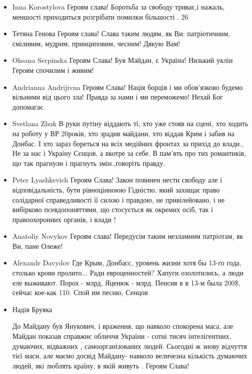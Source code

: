 \begin{itemize}
\item Inna Korostylova
Героям слава!
Боротьба за свободу триває,і нажаль, меншості приходиться розгрібати помилки більшості .
26


\item Тетяна Генова
Героям слава! Слава таким людям, як Ви: патріотичним, сміливим, мудрим, принциповим, чесним! Дякую Вам!

\item Oksana Serpinska
Героям Слава! Був Майдан, є Україна! Низький уклін Героям спочилим і живим!

\item Andrianna Andrijivna
Героям Слава! Нація борців і ми обов'язково будемо вільними від цього зла! Правда за нами і ми переможемо! Нехай Бог допомагає.

\item Svetlana Zhuk
В руки путіну віддають ті, хто уже стояв на сцені, хто ходить на роботу у ВР
20років, хто зрадив майдани, хто віддав Крим і забив на Донбас. І хто зараз
бореться на всіх медійних фронтах за прихід до влади., Не за нас і Україну
Сєнцов, а вкотре за себе.  В пам'ять про тих романтиків, що так прагнули і
прагнуть змін.,говоріть правду.

\item Peter Lyashkevich
Героям Слава!
Закон повинен нести свободу але і відповідальність, бути рівноцінноюю Гідністю, який захищає право солідарної справедливості її силою і правдою, не привілейовано, і не вибірково
псевдопоняттями, що стосується як окремих осіб, так і правоохоронних органів, і влади !

\item Anatoliy Novykov
Героям слава! Передусім таким незламним патріотам, як Ви, пане Олеже!

\item Alexandr Davydov
Где Крым, Донбасс, уровень жизни хотя бы 13-го года, столько крови пролито...
Ради евроценностей? Хапуги озолотились, а люди еле выживают. Порох - млрд,
Яценюк - млрд. Пенсия в в 13-м была 200\$, сейчас кое-как 110. Спой им песню,
Сенцов

\item Надія Бруяка

До Майдану був Янукович, і враження, що навколо спокорена маса, але Майдан
показав справжнє обличчя України - сотні тисяч інтелігентних, думаючих,
відважних , самоорганізованих людей. Сьогодні ж знову відчуття тієї маси, але
маємо досвід Майдану- навколо величезна кількість думаючих людей, які люблять
країну, в якій живуть . Героям Слава!


\end{itemize}
